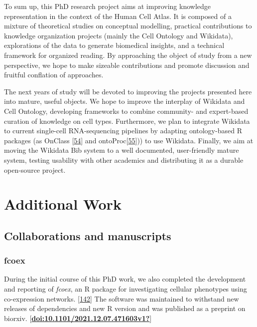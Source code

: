 To sum up, this PhD research project aims at improving knowledge representation in the context of the Human Cell Atlas.
It is composed of a mixture of theoretical studies on conceptual modelling, practical contributions to knowledge organization projects (mainly the Cell Ontology and Wikidata), explorations of the data to generate biomedical insights, and a technical framework for organized reading.
By approaching the object of study from a new perspective, we hope to make sizeable contributions and promote discussion and fruitful conflation of approaches.

The next years of study will be devoted to improving the projects presented here into mature, useful objects.
We hope to improve the interplay of Wikidata and Cell Ontology, developing frameworks to combine community- and expert-based curation of knowledge on cell types.
Furthermore, we plan to integrate Wikidata to current single-cell RNA-sequencing pipelines by adapting ontology-based R packages (as OnClass {[}\protect\hyperlink{ref-sW6aNZJB}{54}{]} and ontoProc{[}\protect\hyperlink{ref-15YmDXALp}{55}{]})) to use Wikidata.
Finally, we aim at moving the Wikidata Bib system to a well documented, user-friendly mature system, testing usability with other academics and distributing it as a durable open-source project.

\hypertarget{additional-work}{%
\section{Additional Work}\label{additional-work}}

\hypertarget{collaborations-and-manuscripts}{%
\subsection{Collaborations and manuscripts}\label{collaborations-and-manuscripts}}

\hypertarget{fcoex}{%
\subsubsection{fcoex}\label{fcoex}}

During the initial course of this PhD work, we also completed the development and reporting of \emph{fcoex}, an R package for investigating cellular phenotypes using co-expression networks. {[}\protect\hyperlink{ref-MxIeSJYt}{142}{]} The software was maintained to withstand new releases of dependencies and new R version and was published as a preprint on biorxiv. {[}\protect\hyperlink{ref-doi:10.1101ux2f2021.12.07.471603v1}{\textbf{doi:10.1101/2021.12.07.471603v1?}}{]}

